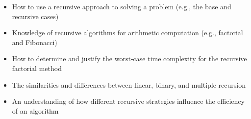 \documentclass[11pt]{article}
\begin{document}
\begin{itemize}

  \itemsep 0in

  \item How to use a recursive approach to solving a problem (e.g., the base
    and recursive cases)
  \item Knowledge of recursive algorithms for arithmetic computation (e.g., factorial
    and Fibonacci)
  \item How to determine and justify the worst-case time complexity for
    the recursive factorial method
  \item The similarities and differences between linear, binary, and multiple
    recursion
  \item An understanding of how different recursive strategies influence the
    efficiency of an algorithm

\end{itemize}
\end{document}
